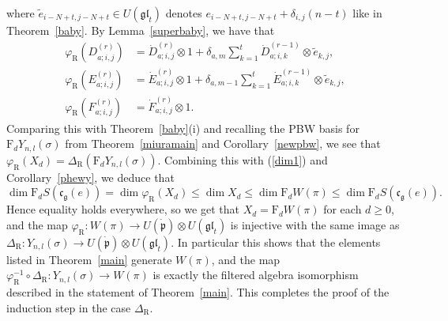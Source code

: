 \documentclass[twoside,12pt,reqno]{amsart}
\def\rt{{\operatorname{\scriptscriptstyle R}}}
\def\F{\mathrm{F}}
\begin{document}
where 
$\tilde e_{i-N+t,j-N+t} \in U(\mathfrak{gl}_t)$
denotes $e_{i-N+t,j-N+t} + \delta_{i,j}(n-t)$ like in Theorem~\ref{baby}.
By Lemma~\ref{superbaby}, we have that
\begin{align}\label{barbie1}
\varphi_{\rt}(D_{a;i,j}^{(r)}) &= \dot D_{a;i,j}^{(r)} \otimes 1
+ \delta_{a,m} \sum_{k=1}^{t}\dot D_{a;i,k}^{(r-1)} \otimes \tilde e_{k,j},\\
\varphi_{\rt}(E_{a;i,j}^{(r)}) &= \dot E_{a;i,j}^{(r)} \otimes 1
+ \delta_{a,m-1} \sum_{k=1}^{t}\dot E_{a;i,k}^{(r-1)} \otimes \tilde e_{k,j},\\
\varphi_{\rt}(F_{a;i,j}^{(r)}) &= \dot F_{a;i,j}^{(r)} \otimes 1.\label{barbie3}
\end{align}
Comparing this with Theorem~\ref{baby}(i) and recalling the
PBW basis for $\F_d Y_{n,l}(\sigma)$ from
Theorem~\ref{miuramain} and 
Corollary~\ref{newpbw},
we see that 
$\varphi_{\rt}(X_d)
=
\Delta_{\rt}(\F_d Y_{n,l}(\sigma))$.
Combining this with (\ref{dim1}) and
Corollary~\ref{phewy},
we deduce that
$$
\dim \F_d S(\mathfrak{c}_{\mathfrak{g}}(e))
= \dim \varphi_{\rt}(X_d) \leq \dim X_d 
\leq \dim \F_d W(\pi) \leq \dim \F_d S(\mathfrak{c}_{\mathfrak{g}}(e)).
$$
Hence equality holds everywhere, so we get that
 $X_d = \F_d W(\pi)$ for each $d \geq 0$, and the
map $\varphi_\rt:W(\pi) \rightarrow U(\dot{\mathfrak{p}}) \otimes U(\mathfrak{gl}_t)$ is injective
with the same image as $\Delta_\rt:Y_{n,l}(\sigma)
\rightarrow U(\dot{\mathfrak{p}}) \otimes U(\mathfrak{gl}_t)$.
In particular this shows that the elements listed in Theorem~\ref{main}
generate $W(\pi)$,
and the map $\varphi_{\rt}^{-1} \circ \Delta_{\rt}:Y_{n,l}(\sigma)
\rightarrow W(\pi)$ is exactly the filtered algebra isomorphism
described in the statement of Theorem~\ref{main}.
This completes the proof of the induction step
in the case $\Delta_{\rt}$. 
\end{document}
